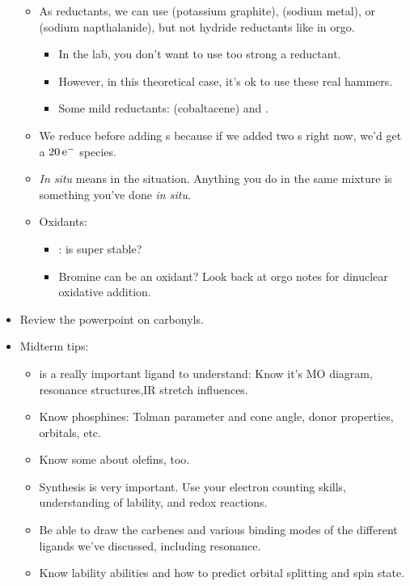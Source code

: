 \documentclass[../notes.tex]{subfiles}
\begin{document}
\begin{itemize}
\begin{itemize}
        \item As reductants, we can use  (potassium graphite),  (sodium metal), or  (sodium napthalanide), but not hydride reductants like in orgo.
        \begin{itemize}
            \item In the lab, you don't want to use too strong a reductant.
            \item However, in this theoretical case, it's ok to use these real hammers.
            \item Some mild reductants:  (cobaltacene) and .
        \end{itemize}
        \item We reduce before adding s because if we added two s right now, we'd get a $20\,\e[-]$ species.
        \item \emph{In situ} means in the situation. Anything you do in the same mixture is something you've done \emph{in situ}.
        \item Oxidants:
        \begin{itemize}
            \item {}:  is super stable?
            \item Bromine can be an oxidant? Look back at orgo notes for dinuclear oxidative addition.
        \end{itemize}
    \end{itemize}
    \item Review the powerpoint on carbonyls.
    \item Midterm tips:
    \begin{itemize}
        \item {} is a really important ligand to understand: Know it's MO diagram, resonance structures,IR stretch influences.
        \item Know phosphines: Tolman parameter and cone angle, donor properties, orbitals, etc.
        \item Know some about olefins, too.
        \item Synthesis is very important. Use your electron counting skills, understanding of lability, and redox reactions.
        \item Be able to draw the carbenes and various binding modes of the different ligands we've discussed, including resonance.
        \item Know lability abilities and how to predict orbital splitting and spin state.

\end{itemize}
\end{itemize}
\end{document}
